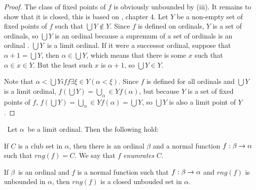 \begin{proof}
\item The class of fixed points of $f$ is obviously unbounded by (iii).
It remains to show that it is closed, this is based on \cite{DrakeBook}, chapter 4. Let $Y$ be a non-empty set of fixed points of $f$ such that $\bigcup Y \not\in Y$. Since $f$ is defined on ordinals, $Y$ is a set of ordinals, so $\bigcup Y$ is an ordinal because a supremum of a set of ordinals is an ordinal%
. $\bigcup Y$ is a limit ordinal. If it were a successor ordinal, suppose that $\alpha+1 = \bigcup Y$, then $\alpha \in \bigcup Y$, which means that there is some $x$ such that $\alpha \in x \in Y$. But the least such $x$ is $\alpha+1$, so $\bigcup Y \in Y$.

Note that $\alpha < \bigcup Y iff \exists \xi \in Y (\alpha < \xi)$. Since $f$ is defined for all ordinals and $\bigcup Y$ is a limit ordinal, $f(\bigcup Y) = \bigcup_\alpha \in Y f(\alpha)$, but because $Y$ is a set of fixed points of $f$, $f(\bigcup Y) = \bigcup_\alpha \in Y f(\alpha) = \bigcup Y$, so $\bigcup Y$ is also a limit point of $Y$.
\ece
\end{proof}

\begin{lemma}\label{lemma:normal_enumerates_club}\
Let $\alpha$ be a limit ordinal. Then the following hold:
\bce[(i)] %
\item If $C$ is a club set in $\alpha$, then there is an ordinal $\beta$ and a normal function $f: \beta \rightarrow \alpha$ such that $rng(f) = C$. We say that $f$ \emph{enumrates} $C$.
\item If $\beta$ is an ordinal and $f$ is a normal function such that $f: \beta \rightarrow \alpha$ and $rng(f)$ is unbounded in $\alpha$, then $rng(f)$ is a closed unbouded set in $\alpha$.
\ece
\end{lemma}

